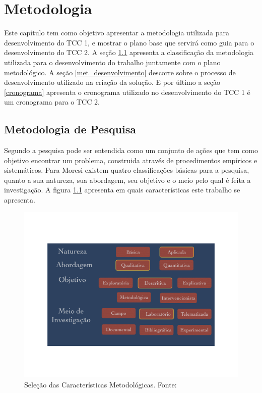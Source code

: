 \chapter[Metodologia]{Metodologia}
Este capítulo tem como objetivo apresentar a metodologia utilizada para desenvolvimento do TCC 1, e mostrar o plano base que servirá como guia para o desenvolvimento do TCC 2. A seção \ref{met_pesquisa} apresenta a classificação da metodologia utilizada para o desenvolvimento do trabalho juntamente com o plano metodológico. A seção \ref{met_desenvolvimento} descorre sobre o processo de desenvolvimento utilizado na criação da solução. E por último a seção  \ref{cronograma} apresenta o cronograma utilizado no desenvolvimento do TCC 1 é um cronograma para o TCC 2.
\section{Metodologia de Pesquisa}
\label{met_pesquisa}
Segundo \cite{moresi_metodologia_2003} a pesquisa pode ser entendida como um conjunto de ações que tem como objetivo encontrar um problema, construida através de procedimentos empíricos e sistemáticos. Para Moresi existem quatro classificações básicas para a pesquisa, quanto a sua natureza, sua abordagem, seu objetivo e o meio pelo qual é feita a investigação. A figura \ref{img:met_pesquisa} apresenta em quais características este trabalho se apresenta.
\graphicspath{{figuras/}}
\begin{figure}[h]
\centering
\includegraphics[scale=0.50]{metodologia_pesquisa}
\caption{Seleção das Características Metodológicas. Fonte: \cite{moresi_metodologia_2003}}
\label{img:met_pesquisa}
\end{figure}

